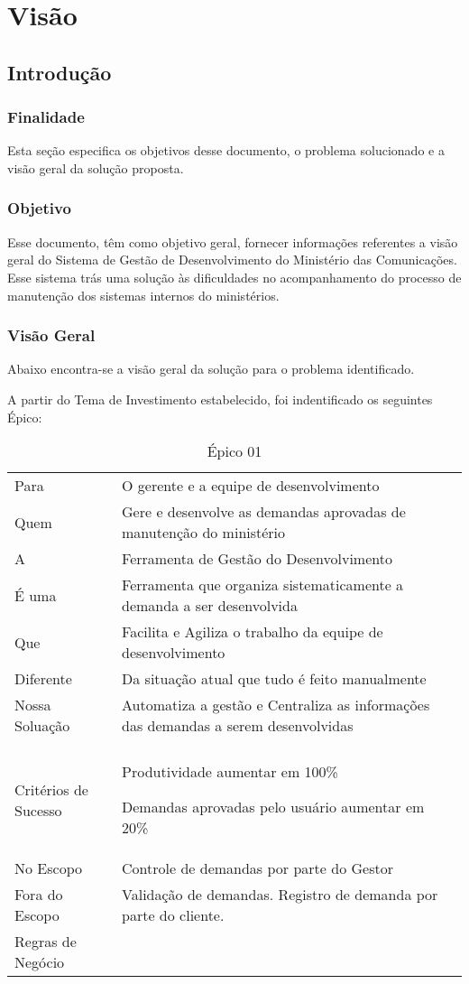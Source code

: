 \chapter[Visão]{Visão}

\section{Introdução}

\subsection{Finalidade}

Esta seção especifica os objetivos desse documento, o problema solucionado e a visão geral da solução proposta.

\subsection{Objetivo}

Esse documento, têm como objetivo geral, fornecer informações referentes a visão geral do Sistema de Gestão de Desenvolvimento do Ministério das Comunicações. Esse sistema trás uma solução às dificuldades no acompanhamento do processo de manutenção dos sistemas internos do ministérios.

\subsection{Visão Geral}

Abaixo encontra-se a visão geral da solução para o problema identificado.

A partir do Tema de Investimento estabelecido, foi indentificado os seguintes Épico:

\begin{table}[H]
	\begin{tabular}{|>{\raggedright}p{4cm}|>{\raggedright}p{10cm}|}
		\hline 
		\multicolumn{2}{|c|}{Caso de Negócio}\tabularnewline
		\hline 
		Para & O gerente e a equipe de desenvolvimento\tabularnewline
		\hline 
		Quem & Gere e desenvolve as demandas aprovadas de manutenção do ministério\tabularnewline
		\hline 
		A & Ferramenta de Gestão do Desenvolvimento\tabularnewline
		\hline 
		É uma & Ferramenta que organiza sistematicamente a demanda a ser desenvolvida\tabularnewline
		\hline 
		Que & Facilita e Agiliza o trabalho da equipe de desenvolvimento\tabularnewline
		\hline 
		Diferente & Da situação atual que tudo é feito manualmente\tabularnewline
		\hline 
		Nossa Soluação & Automatiza a gestão e Centraliza as informações das demandas a serem
		desenvolvidas\tabularnewline
		\hline 
		\multicolumn{2}{|c|}{Escopo}\tabularnewline
		\hline 
		Critérios de Sucesso & Produtividade aumentar em 100\%

		Demandas aprovadas pelo usuário aumentar em 20\%\tabularnewline
		\hline 
		No Escopo & Controle de demandas por parte do Gestor\tabularnewline
		\hline 
		Fora do Escopo & Validação de demandas. Registro de demanda por parte do cliente.\tabularnewline
		\hline 
		Regras de Negócio & \tabularnewline
		\hline 
	\end{tabular}
	\caption{Épico 01}
	\label{Epico_01}
\end{table}

